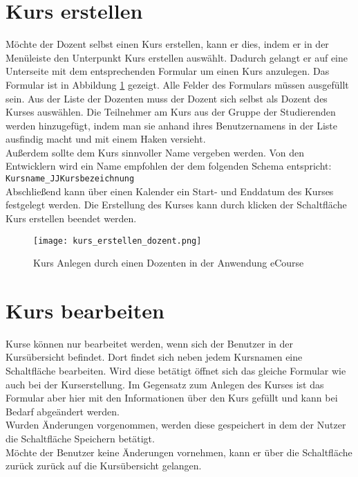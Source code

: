 \section{Kurs erstellen}
Möchte der Dozent selbst einen Kurs erstellen, kann er dies, indem er in der Menüleiste den Unterpunkt \glqq Kurs erstellen\grqq{} auswählt. Dadurch gelangt er auf eine Unterseite mit dem entsprechenden Formular um einen Kurs anzulegen. Das Formular ist in Abbildung \ref{fib:kurs_anlegen} gezeigt. Alle Felder des Formulars müssen ausgefüllt sein. Aus der Liste der Dozenten muss der Dozent sich selbst als Dozent des Kurses auswählen.
Die Teilnehmer am Kurs aus der Gruppe der Studierenden werden hinzugefügt, indem man sie anhand ihres Benutzernamens in der Liste ausfindig macht und mit einem Haken versieht. \\
Außerdem sollte dem Kurs sinnvoller Name vergeben werden. Von den Entwicklern wird ein Name empfohlen der dem folgenden Schema entspricht: \\
\verb/Kursname_JJKursbezeichnung/\\
Abschließend kann über einen Kalender ein Start- und Enddatum des Kurses festgelegt werden. 
Die Erstellung des Kurses kann durch klicken der Schaltfläche \glqq Kurs erstellen\grqq{} beendet werden.

\begin{figure}[h]
\centering
\texttt{[image: kurs\_erstellen\_dozent.png]}
\caption{Kurs Anlegen durch einen Dozenten in der Anwendung eCourse}
\label{fib:kurs_anlegen}
\end{figure}
\section{Kurs bearbeiten}
Kurse können nur bearbeitet werden, wenn sich der Benutzer in der Kursübersicht befindet. Dort findet sich neben jedem Kursnamen eine Schaltfläche \glqq bearbeiten\grqq . Wird diese betätigt öffnet sich das gleiche Formular wie auch bei der Kurserstellung. Im Gegensatz zum Anlegen des Kurses ist das Formular aber hier mit den Informationen über den Kurs gefüllt und kann bei Bedarf abgeändert werden.\\
Wurden Änderungen vorgenommen, werden diese gespeichert in dem der Nutzer die Schaltfläche \glqq Speichern\grqq{} betätigt.\\
Möchte der Benutzer keine Änderungen vornehmen, kann er über die Schaltfläche \glqq zurück\grqq{} zurück auf die Kursübersicht gelangen.


